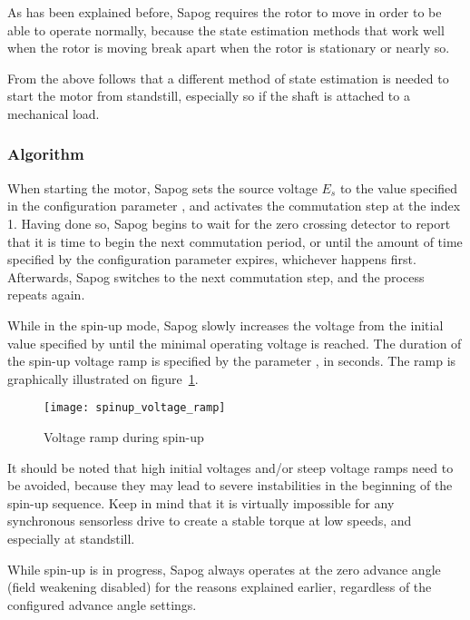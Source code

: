 \documentclass{zubaxdoc}
\begin{document}
As has been explained before, Sapog requires the rotor to move in order to be able to operate normally,
because the state estimation methods that work well when the rotor is moving break apart when the rotor is
stationary or nearly so.

From the above follows that a different method of state estimation is needed to start the motor
from standstill, especially so if the shaft is attached to a mechanical load.

\subsubsection{Algorithm}

When starting the motor, Sapog sets the source voltage $E_s$ to the value specified in the
configuration parameter , and activates the commutation step at the index 1.
Having done so, Sapog begins to wait for the zero crossing detector to report that it is time to
begin the next commutation period, or until the amount of time specified by the configuration parameter
 expires, whichever happens first.
Afterwards, Sapog switches to the next commutation step, and the process repeats again.

While in the spin-up mode, Sapog slowly increases the voltage from the initial value specified
by  until the minimal operating voltage  is reached.
The duration of the spin-up voltage ramp is specified by the parameter ,
in seconds.
The ramp is graphically illustrated on figure~\ref{spinup_voltage_ramp}.

\begin{figure}[hbt]
    \centering
    \texttt{[image: spinup\_voltage\_ramp]}
    \caption{Voltage ramp during spin-up
    \label{spinup_voltage_ramp}}
\end{figure}

It should be noted that high initial voltages and/or steep voltage ramps need to be avoided,
because they may lead to severe instabilities in the beginning of the spin-up sequence.
Keep in mind that it is virtually impossible for any synchronous sensorless drive to create a stable
torque at low speeds, and especially at standstill.

While spin-up is in progress, Sapog always operates at the zero advance angle
(field weakening disabled) for the reasons explained earlier,
regardless of the configured advance angle settings.
\end{document}
